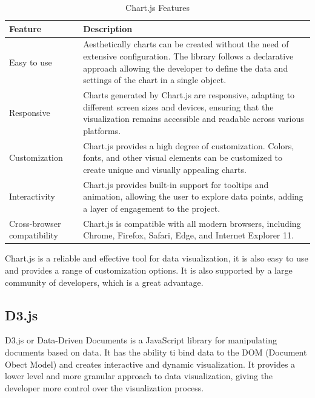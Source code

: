 \begin{table}[H]
    \centering
    
    \begin{tabularx}{\textwidth}{|l|X|}
        \hline
        \textbf{Feature} & \textbf{Description} \\
        \hline
        Easy to use & Aesthetically charts can be created without the need of extensive configuration. The library follows a declarative approach allowing the developer to define the data and settings of the chart in a single object. \\
        \hline
        Responsive & Charts generated by Chart.js are responsive, adapting to different screen sizes and devices, ensuring that the visualization remains accessible and readable across various platforms. \\
        \hline
        Customization & Chart.js provides a high degree of customization. Colors, fonts, and other visual elements can be customized to create unique and visually appealing charts. \\
        \hline
        Interactivity & Chart.js provides built-in support for tooltips and animation, allowing the user to explore data points, adding a layer of engagement to the project. \\
        \hline
        Cross-browser compatibility & Chart.js is compatible with all modern browsers, including Chrome, Firefox, Safari, Edge, and Internet Explorer 11. \\
        \hline
    \end{tabularx}
    \label{tab:chart-js-features}
    \caption{Chart.js Features}
\end{table}


Chart.js is a reliable and effective tool for data visualization, it is also easy to use and provides a range of customization options. It is also supported by a large community of developers, which is a great advantage.

\subsection{D3.js}
D3.js or Data-Driven Documents is a JavaScript library for manipulating documents based on data. It has the ability ti bind data to the DOM (Document Obect Model) and creates interactive and dynamic visualization. It provides a lower level and more granular approach to data visualization, giving the developer more control over the visualization process.\cite{d3}


